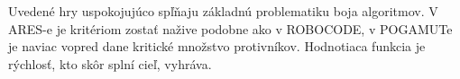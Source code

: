 Uvedené hry uspokojujúco spľňaju základnú problematiku boja algoritmov. V ARES-e je kritériom zostať nažive podobne ako v ROBOCODE, v POGAMUTe je naviac vopred dane kritické množstvo protivníkov. Hodnotiaca funkcia je rýchlosť, kto skôr splní cieľ, vyhráva.\\
